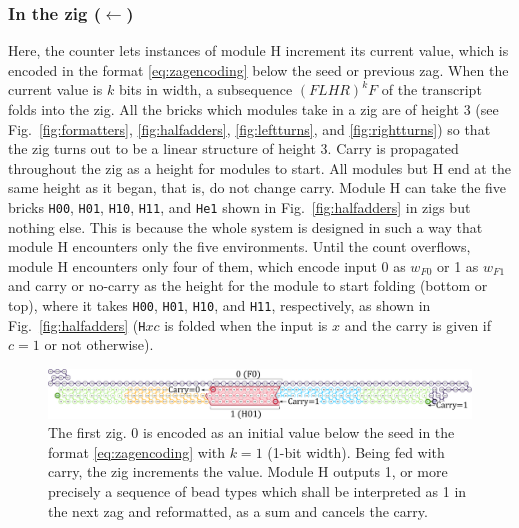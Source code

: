 \documentclass[runningheads]{llncs}
\begin{document}
\subsubsection{In the zig ($\leftarrow$)} 
Here, the counter lets instances of module H increment its current value, which is encoded in the format \eqref{eq:zagencoding} below the seed or previous zag.
When the current value is $k$ bits in width, a subsequence $(FLHR)^kF$ of the transcript folds into the zig.
All the bricks which modules take in a zig are of height 3 (see Fig.~\ref{fig:formatters},  \ref{fig:halfadders}, \ref{fig:leftturns}, and \ref{fig:rightturns}) so that the zig turns out to be a linear structure of height 3.
Carry is propagated throughout the zig as a height for modules to start.
All modules but H end at the same height as it began, that is, do not change carry.
Module H can take the five bricks \texttt{H00}, \texttt{H01}, \texttt{H10}, \texttt{H11}, and \texttt{He1} shown in Fig.~\ref{fig:halfadders} in zigs but nothing else.
This is because the whole system is designed in such a way that module H encounters only the five environments.
Until the count overflows, module H encounters only four of them, which encode input 0 as $w_{F0}$ or 1 as $w_{F1}$ and carry or no-carry as the height for the module to start folding (bottom or top), where it takes \texttt{H00}, \texttt{H01}, \texttt{H10}, and \texttt{H11}, respectively, as shown in Fig.~\ref{fig:halfadders} (\texttt{H}$xc$ is folded when the input is $x$ and the carry is given if $c=1$ or not otherwise).

\begin{figure}[tb]
\centering
\includegraphics[width=\linewidth]{fig/svg/CounterEx5_1.pdf}
\caption{
The first zig.
0 is encoded as an initial value below the seed in the format \eqref{eq:zagencoding} with $k = 1$ (1-bit width).
Being fed with carry, the zig increments the value.
Module H outputs 1, or more precisely a sequence of bead types which shall be interpreted as 1 in the next zag and reformatted, as a sum and cancels the carry.
}

\label{fig:counter1stzig}
\end{figure}
\end{document}
